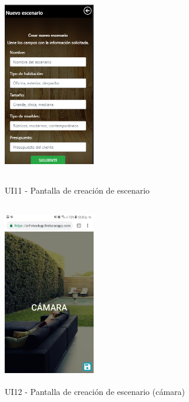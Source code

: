 \begin{figure}[h!]
	\begin{minipage}{0.48\textwidth}
		\centering
		\includegraphics[width=4cm,height=8cm]{imagenes/Anexos/Mockup/nuevo_escenario.png}
		\caption{UI11 - Pantalla de creación de escenario}
		\label{fig:newesc}
	\end{minipage}\hfill
	\begin{minipage}{0.48\textwidth}
		\centering
		\includegraphics[width=4cm,height=8cm]{imagenes/Anexos/Mockup/camara.jpg}
		\caption{UI12 - Pantalla de creación de escenario (cámara) }
		\label{fig:camara} 
	\end{minipage}\hfill
\end{figure}

